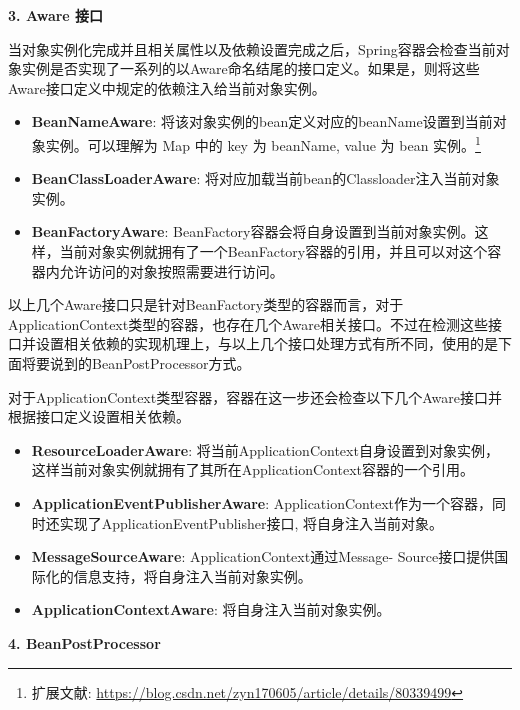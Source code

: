 \noindent\textbf{3. Aware 接口}

当对象实例化完成并且相关属性以及依赖设置完成之后，Spring容器会检查当前对象实例是否实现了一系列的以Aware命名结尾的接口定义。如果是，则将这些Aware接口定义中规定的依赖注入给当前对象实例。

\begin{itemize}
    \item \textbf{BeanNameAware}: 将该对象实例的bean定义对应的beanName设置到当前对象实例。可以理解为 Map 中的 key 为 beanName, value 为 bean 实例。\footnote{扩展文献: \url{https://blog.csdn.net/zyn170605/article/details/80339499}}
    \item \textbf{BeanClassLoaderAware}: 将对应加载当前bean的Classloader注入当前对象实例。
    \item \textbf{BeanFactoryAware}: BeanFactory容器会将自身设置到当前对象实例。这样，当前对象实例就拥有了一个BeanFactory容器的引用，并且可以对这个容器内允许访问的对象按照需要进行访问。
\end{itemize}

以上几个Aware接口只是针对BeanFactory类型的容器而言，对于ApplicationContext类型的容器，也存在几个Aware相关接口。不过在检测这些接口并设置相关依赖的实现机理上，与以上几个接口处理方式有所不同，使用的是下面将要说到的BeanPostProcessor方式。

对于ApplicationContext类型容器，容器在这一步还会检查以下几个Aware接口并根据接口定义设置相关依赖。

\begin{itemize}
    \item \textbf{ResourceLoaderAware}: 将当前ApplicationContext自身设置到对象实例，这样当前对象实例就拥有了其所在ApplicationContext容器的一个引用。
    \item \textbf{ApplicationEventPublisherAware}: ApplicationContext作为一个容器，同时还实现了ApplicationEventPublisher接口, 将自身注入当前对象。
    \item \textbf{MessageSourceAware}: ApplicationContext通过Message- Source接口提供国际化的信息支持，将自身注入当前对象实例。
    \item \textbf{ApplicationContextAware}: 将自身注入当前对象实例。
\end{itemize}

\noindent\textbf{4. BeanPostProcessor}


